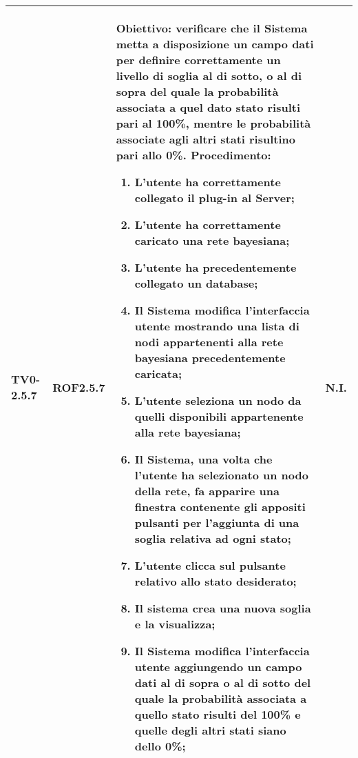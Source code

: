 \begin{longtable}{|C{.15\textwidth}|C{.13\textwidth}|m{.52\textwidth}|C{.08\textwidth}|}
TV0-2.5.7 & ROF2.5.7 &
	\textbf{Obiettivo}: verificare che il Sistema metta a disposizione un campo dati per definire correttamente un livello di soglia al di sotto, o al di sopra del quale la probabilità associata a quel dato stato risulti pari al 100\%, mentre le probabilità associate agli altri stati risultino pari allo 0\%. \newline
	\textbf{Procedimento}:
	\begin{enumerate}
		\item L'utente ha correttamente collegato il plug-in al Server;
		\item L'utente ha correttamente caricato una rete bayesiana;
		\item L'utente ha precedentemente collegato un database;
		\item Il Sistema modifica l'interfaccia utente mostrando una lista di nodi appartenenti alla rete bayesiana precedentemente caricata;
		\item L'utente seleziona un nodo da quelli disponibili appartenente alla rete bayesiana;
		\item Il Sistema, una volta che l'utente ha selezionato un nodo della rete, fa apparire una finestra contenente gli appositi pulsanti per l'aggiunta di una soglia relativa ad ogni stato;
		\item L'utente clicca sul pulsante relativo allo stato desiderato;
		\item Il sistema crea una nuova soglia e la visualizza;
		\item Il Sistema modifica l'interfaccia utente aggiungendo un campo dati al di sopra o al di sotto del quale la probabilità associata a quello stato risulti del 100\% e quelle degli altri stati siano dello 0\%;
	\end{enumerate}
	& N.I. \\
\hline


\end{longtable}
